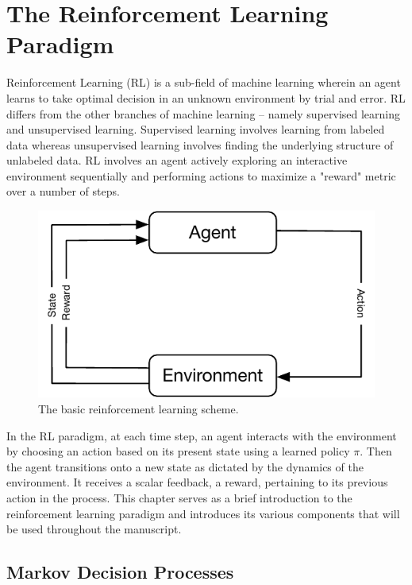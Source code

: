 \normallinespacing

\chapter{The Reinforcement Learning Paradigm}

Reinforcement Learning (RL) is a sub-field of machine learning wherein an agent learns to take optimal decision in an unknown environment by trial and error.
RL differs from the other branches of machine learning -- namely supervised learning and unsupervised learning.
Supervised learning involves learning from labeled data whereas unsupervised learning involves finding the underlying structure of unlabeled data.
RL involves an agent actively exploring an interactive environment sequentially and
performing actions to maximize a "reward" metric over a number of steps.

\begin{figure}[!htbp]
    \centering
    \includegraphics{rl/rl_scheme.pdf}
    \caption{The basic reinforcement learning scheme.}
    \label{fig:rl_scheme}
\end{figure}

In the RL paradigm, at each time step, an agent interacts with the environment by choosing an action based on its present state using a learned policy $\pi$.
Then the agent transitions onto a new state as dictated by the dynamics of the environment.
It receives a scalar feedback, a reward, pertaining to its previous action in the process.
This chapter serves as a brief introduction to the reinforcement learning paradigm and introduces its various components that will be used throughout the manuscript.

\section{Markov Decision Processes}

